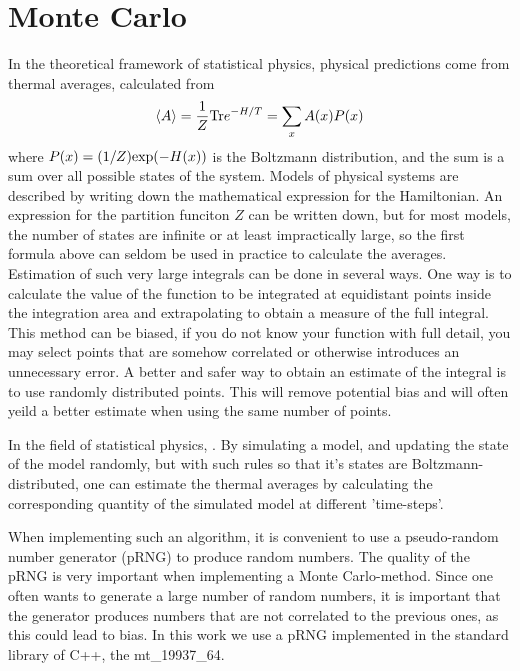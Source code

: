 %
\section{Monte Carlo}
In the theoretical framework of statistical physics, physical predictions come from thermal averages, calculated from 
\begin{equation}
  \langle A\rangle = \frac{1}{Z}\textrm{Tr} e^{-H/T} = \sum_x A(x) P(x)
  \label{MC:eq:avg}
\end{equation}
where  $P(x) = (1/Z)\textrm{exp}(-H(x))$ is the Boltzmann distribution, and the sum is a sum over all possible states of the system. 
Models of physical systems are described by writing down the mathematical expression for the Hamiltonian.
An expression for the partition funciton $Z$ can be written down, but for most models, the number of states are infinite or at least impractically large, so the first formula above can seldom be used in practice to calculate the averages.
Estimation of such very large integrals can be done in several ways.
One way is to calculate the value of the function to be integrated at equidistant points inside the integration area and extrapolating to obtain a measure of the full integral.
This method can be biased, if you do not know your function with full detail, you may select points that are somehow correlated or otherwise introduces an unnecessary error.
A better and safer way to obtain an estimate of the integral is to use randomly distributed points.
This will remove potential bias and will often yeild a better estimate when using the same number of points.

In the field of statistical physics, . By simulating a model, and updating the state of the model randomly, but with such rules so that it's states are Boltzmann-distributed, one can estimate the thermal averages by calculating the corresponding quantity of the simulated model at different 'time-steps'.

When implementing such an algorithm, it is convenient to use a pseudo-random number generator (pRNG) to produce random numbers.
The quality of the pRNG is very important when implementing a Monte Carlo-method.
Since one often wants to generate a large number of random numbers, it is important that the generator produces numbers that are not correlated to the previous ones, as this could lead to bias. 
In this work we use a pRNG implemented in the standard library of C++, the mt\_19937\_64.

